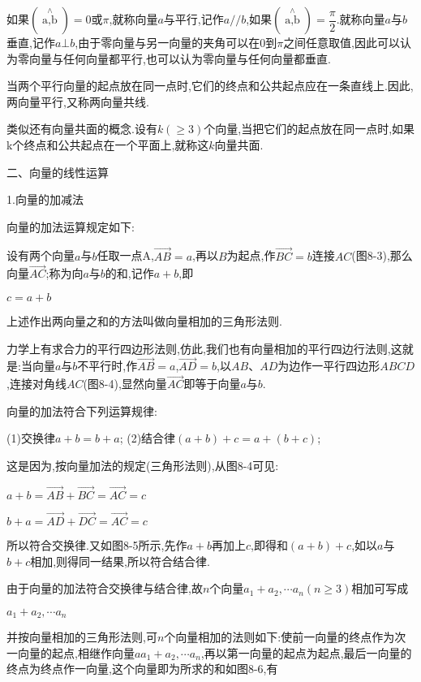 \documentclass[oneside]{book}
\begin{document}
如果$(\mathop {a,b}\limits^ \wedge  ) = 0$或$\pi $,就称向量$a$与平行,记作$a /  / b$,如果$(\mathop {a,b}\limits^ \wedge  ) = \dfrac{\pi }{2}$.就称向量$a$与$b$垂直,记作$a \bot b$,由于零向量与另一向量的夹角可以在0到$\pi $之间任意取值,因此可以认为零向量与任何向量都平行,也可以认为零向量与任何向量都垂直.

当两个平行向量的起点放在同一点时,它们的终点和公共起点应在一条直线上.因此,两向量平行,又称两向量共线.

类似还有向量共面的概念.设有$k\left( { \geqslant 3} \right)$个向量,当把它们的起点放在同一点时,如果k个终点和公共起点在一个平面上,就称这$k$向量共面.

二、向量的线性运算

1.向量的加减法

向量的加法运算规定如下:

设有两个向量$a$与$b$任取一点A,$\overrightarrow {AB}  = a$,再以$B$为起点,作$\overrightarrow {BC}  = b$连接$AC$(图8-3),那么向量$\overrightarrow {AC} $;称为向$a$与$b$的和,记作$a+b$,即

$c=a+b$

上述作出两向量之和的方法叫做向量相加的三角形法则.

力学上有求合力的平行四边形法则,仿此,我们也有向量相加的平行四边行法则,这就是:当向量$a$与$b$不平行时,作$\overrightarrow {AB}  = a$,$\overrightarrow {AD}  = b$,以$AB$、$AD$为边作一平行四边形$ABCD$,连接对角线$AC$(图8-4),显然向量$\overrightarrow {AC} $即等于向量$a$与$b$.

向量的加法符合下列运算规律:

(1)交换律$a+b=b+a$;
(2)结合律$(a + b) + c = a + (b + c)$;

这是因为,按向量加法的规定(三角形法则),从图8-4可见:

$a + b = \overrightarrow {AB}  + \overrightarrow {BC}  = \overrightarrow {AC}  = c$

$b + a = \overrightarrow {AD}  + \overrightarrow {DC}  = \overrightarrow {AC}  = c$

所以符合交换律.又如图8-5所示,先作$a+b$再加上$c$,即得和$(a+b)+c$,如以$a$与$b+c$相加,则得同一结果,所以符合结合律.

由于向量的加法符合交换律与结合律,故$n$个向量${a_1} + {a_2}, \cdots {a_n}(n \geqslant 3)$相加可写成

${a_1} + {a_2}, \cdots {a_n}$

并按向量相加的三角形法则,可$n$个向量相加的法则如下:使前一向量的终点作为次一向量的起点,相继作向量$a{a_1} + {a_2}, \cdots {a_n}$,再以第一向量的起点为起点,最后一向量的终点为终点作一向量,这个向量即为所求的和如图8-6,有
\end{document}
